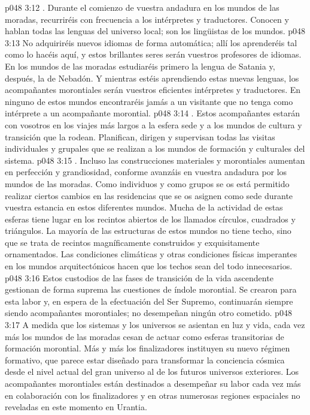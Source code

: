 \vs p048 3:12 . Durante el comienzo de vuestra andadura en los mundos de las moradas, recurriréis con frecuencia a los intérpretes y traductores. Conocen y hablan todas las lenguas del universo local; son los lingüistas de los mundos.
\vs p048 3:13 No adquiriréis nuevos idiomas de forma automática; allí los aprenderéis tal como lo hacéis aquí, y estos brillantes seres serán vuestros profesores de idiomas. En los mundos de las moradas estudiaréis primero la lengua de Satania y, después, la de Nebadón. Y mientras estéis aprendiendo estas nuevas lenguas, los acompañantes morontiales serán vuestros eficientes intérpretes y traductores. En ninguno de estos mundos encontraréis jamás a un visitante que no tenga como intérprete a un acompañante morontial.
\vs p048 3:14 . Estos acompañantes estarán con vosotros en los viajes más largos a la esfera sede y a los mundos de cultura y transición que la rodean. Planifican, dirigen y supervisan todas las visitas individuales y grupales que se realizan a los mundos de formación y culturales del sistema.
\vs p048 3:15 . Incluso las construcciones materiales y morontiales aumentan en perfección y grandiosidad, conforme avanzáis en vuestra andadura por los mundos de las moradas. Como individuos y como grupos se os está permitido realizar ciertos cambios en las residencias que se os asignen como sede durante vuestra estancia en estos diferentes mundos. Mucha de la actividad de estas esferas tiene lugar en los recintos abiertos de los llamados círculos, cuadrados y triángulos. La mayoría de las estructuras de estos mundos no tiene techo, sino que se trata de recintos magníficamente construidos y exquisitamente ornamentados. Las condiciones climáticas y otras condiciones físicas imperantes en los mundos arquitectónicos hacen que los techos sean del todo innecesarios.
\vs p048 3:16 \pc Estos custodios de las fases de transición de la vida ascendente gestionan de forma suprema las cuestiones de índole morontial. Se crearon para esta labor y, en espera de la efectuación del Ser Supremo, continuarán siempre siendo acompañantes morontiales; no desempeñan ningún otro cometido.
\vs p048 3:17 A medida que los sistemas y los universos se asientan en luz y vida, cada vez más los mundos de las moradas cesan de actuar como esferas transitorias de formación morontial. Más y más los finalizadores instituyen su nuevo régimen formativo, que parece estar diseñado para transformar la conciencia cósmica desde el nivel actual del gran universo al de los futuros universos exteriores. Los acompañantes morontiales están destinados a desempeñar su labor cada vez más en colaboración con los finalizadores y en otras numerosas regiones espaciales no reveladas en este momento en Urantia.

